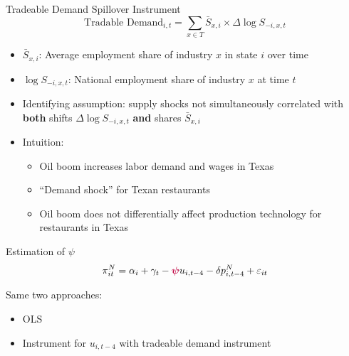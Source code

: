 \documentclass[11pt,aspectratio=169,xcolor={dvipsnames},hyperref={pdftex,pdfpagemode=UseNone,hidelinks,pdfdisplaydoctitle=true},usepdftitle=false]{beamer}
\begin{document}
\begin{frame}{Tradeable Demand Spillover Instrument} \label{IV}
	\[\text{Tradable Demand}_{i,t} = \sum_{x \in T} \bar{S}_{x,i} \times \Delta \log{S}_{-i,x,t}\] \vspace{-12pt} 
	
	\begin{itemize}
		\itemsep0.5em
		\item $\bar{S}_{x,i}$: Average employment share of industry $x$ in state $i$ over time \vspace{-0.5em}			
		\item $\log S_{-i,x,t}$: National employment share of industry $x$ at time $t$
	\end{itemize}	
	
	\begin{itemize}
		\item Identifying assumption: supply shocks not simultaneously correlated with \textbf{both} shifts $ \Delta \log S_{-i,x,t}$ \textbf{and} shares $\bar{S}_{x,i}$ 
		\item Intuition:
		\begin{itemize}
			\item Oil boom increases labor demand and wages in Texas
			\item ``Demand shock'' for Texan restaurants
			\item Oil boom does not differentially affect production technology for restaurants in Texas
		\end{itemize}		
	\end{itemize}			
\end{frame}


\begin{frame}{Estimation of $\psi$}
	\[ \pi_{it}^{N} = \alpha_i + \gamma_{t} - \textcolor{purple}{\boldsymbol{\psi}} u_{i,t-4} - \delta p_{i,t-4}^{N} + \varepsilon_{it} \] 
	
	\vspace{20pt}
	
	Same two approaches:
	
	\vspace{10pt}
	
	\begin{itemize}
		\itemsep1em 
		\item OLS 
		\item Instrument for $u_{i,t-4}$ with tradeable demand instrument
	\end{itemize}
\end{frame}
\end{document}
